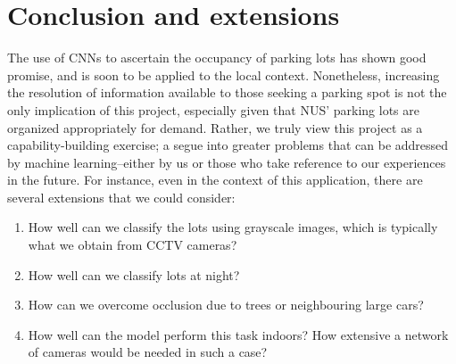 \documentclass[a4paper, 11pt]{article} %
\begin{document}
\section{Conclusion and extensions}
	The use of CNNs to ascertain the occupancy of parking lots has shown good promise, and is soon 
	to be applied to the local context. Nonetheless, increasing the resolution of information available to 
	those seeking a parking spot is not the only implication of this project, especially given that NUS' 
	parking lots are organized appropriately for demand. Rather, we truly view this project as a 
	capability-building exercise; a segue into greater problems that can be addressed by machine 
	learning--either by us or those who take reference to our experiences in the future. For instance, 
	even in the context of this application, there are several extensions that we could consider:
	\begin{enumerate}
		\item How well can we classify the lots using grayscale images, which is typically what we obtain 
		from CCTV cameras?
		\item How well can we classify lots at night?
		\item How can we overcome occlusion due to trees or neighbouring large cars?
		\item How well can the model perform this task indoors? How extensive a network of cameras 
		would be needed in such a case?
	\end{enumerate}

\end{document}
